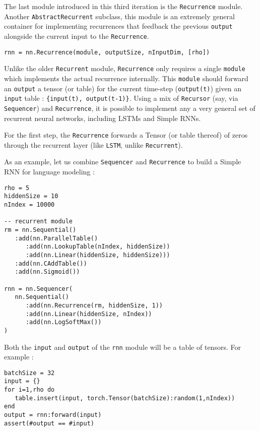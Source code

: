 \documentclass{article} %
\providecommand{\inlinecode}[1]{\texttt{#1}}
\begin{document}
The last module introduced in this third iteration is the \inlinecode{Recurrence} module.
Another \inlinecode{AbstractRecurrent} subclass, this module
is an extremely general container for implementing recurrences that feedback the previous \inlinecode{output} 
alongside the current {input} to the \inlinecode{Recurrence}. 

\begin{verbatim}
rnn = nn.Recurrence(module, outputSize, nInputDim, [rho])
\end{verbatim}

Unlike the older \inlinecode{Recurrent} module, \inlinecode{Recurrence} only 
requires a single \inlinecode{module} which implements the actual 
recurrence internally.
This \inlinecode{module} should forward an \inlinecode{output} a tensor (or table) for the current time-step (\inlinecode{output(t)}) 
given an \inlinecode{input} table : \inlinecode{\{input(t), output(t-1)\}}.
Using a mix of \inlinecode{Recursor} (say, via \inlinecode{Sequencer}) and \inlinecode{Recurrence}, 
it is possible to implement any a very general set of recurrent neural networks, including LSTMs and Simple RNNs.

For the first step, the \inlinecode{Recurrence} forwards a Tensor (or table thereof) of zeros through 
the recurrent layer (like \inlinecode{LSTM}, unlike \inlinecode{Recurrent}).

As an example, let us combine \inlinecode{Sequencer} and \inlinecode{Recurrence} to build a Simple RNN for language modeling :

\begin{verbatim}
rho = 5
hiddenSize = 10
nIndex = 10000

-- recurrent module
rm = nn.Sequential()
   :add(nn.ParallelTable()
      :add(nn.LookupTable(nIndex, hiddenSize))
      :add(nn.Linear(hiddenSize, hiddenSize)))
   :add(nn.CAddTable())
   :add(nn.Sigmoid())

rnn = nn.Sequencer(
   nn.Sequential()
      :add(nn.Recurrence(rm, hiddenSize, 1))
      :add(nn.Linear(hiddenSize, nIndex))
      :add(nn.LogSoftMax())
)
\end{verbatim}

Both the \inlinecode{input} and \inlinecode{output} of the \inlinecode{rnn} module will 
be a table of tensors. For example :

\begin{verbatim}
batchSize = 32
input = {}
for i=1,rho do
   table.insert(input, torch.Tensor(batchSize):random(1,nIndex))
end
output = rnn:forward(input)
assert(#output == #input)
\end{verbatim}
\end{document}
